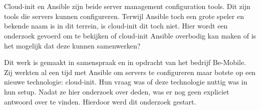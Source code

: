 
%
%

%



\chapter*{}

Cloud-init en Ansible zijn beide server management configuration tools. Dit zijn tools die servers kunnen configureren. Terwijl Ansible toch een grote speler en bekende naam is in dit terrein, is cloud-init dit toch niet. Hier wordt een onderzoek gevoerd om te bekijken of cloud-init Ansible overbodig kan maken of is het mogelijk dat deze kunnen samenwerken?

Dit werk is gemaakt in samenspraak en in opdracht van het bedrijf Be-Mobile. Zij werkten al een tijd met Ansible om servers te configureren maar botste op een nieuwe technologie: cloud-init. Hun vraag was of deze technologie nuttig was in hun setup. Nadat ze hier onderzoek over deden, was er nog geen expliciet antwoord over te vinden. Hierdoor werd dit onderzoek gestart.

